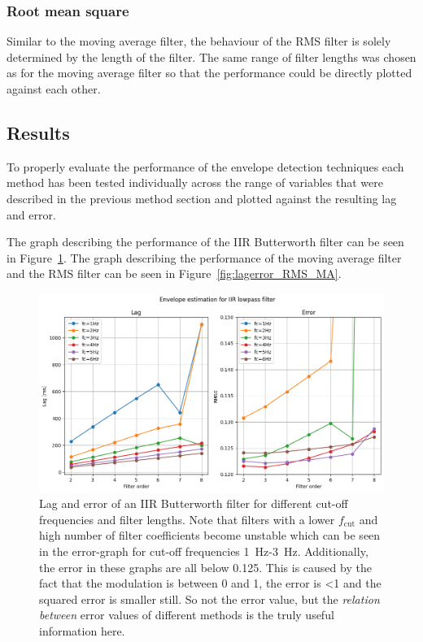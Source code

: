 \subsubsection{Root mean square}
Similar to the moving average filter, the behaviour of the RMS filter is solely determined by the length of the filter. The same range of filter lengths was chosen as for the moving average filter so that the performance could be directly plotted against each other.

\subsection{Results}
To properly evaluate the performance of the envelope detection techniques each method has been tested individually across the range of variables that were described in the previous method section and plotted against the resulting lag and error. 

The graph describing the performance of the IIR Butterworth filter can be seen in Figure~\ref{fig:lagerror_iir}. The graph describing the performance of the moving average filter and the RMS filter can be seen in Figure~\ref{fig:lagerror_RMS_MA}.

\begin{figure}[h!t]
	\begin{center}
		\includegraphics[width=1.0\columnwidth]{images/lagerror_iirfilter.png}
	\end{center}
	\caption{Lag and error of an IIR Butterworth filter for different cut-off frequencies and filter lengths. Note that filters with a lower $f_\text{cut}$ and high number of filter coefficients become unstable which can be seen in the error-graph for cut-off frequencies \SI{1}{\hertz}-\SI{3}{\hertz}. Additionally, the error in these graphs are all below 0.125. This is caused by the fact that the modulation is between 0 and 1, the error is <1 and the squared error is smaller still. So not the error value, but the \textit{relation between} error values of different methods is the truly useful information here.}
	\label{fig:lagerror_iir}
\end{figure}

